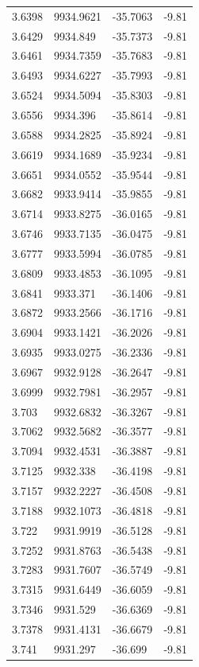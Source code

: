 \begin{table}[H]
\begin{tabular}{llll}
3.6398 & 9934.9621 & -35.7063 & -9.81 \\
3.6429 & 9934.849 & -35.7373 & -9.81 \\
3.6461 & 9934.7359 & -35.7683 & -9.81 \\
3.6493 & 9934.6227 & -35.7993 & -9.81 \\
3.6524 & 9934.5094 & -35.8303 & -9.81 \\
3.6556 & 9934.396 & -35.8614 & -9.81 \\
3.6588 & 9934.2825 & -35.8924 & -9.81 \\
3.6619 & 9934.1689 & -35.9234 & -9.81 \\
3.6651 & 9934.0552 & -35.9544 & -9.81 \\
3.6682 & 9933.9414 & -35.9855 & -9.81 \\
3.6714 & 9933.8275 & -36.0165 & -9.81 \\
3.6746 & 9933.7135 & -36.0475 & -9.81 \\
3.6777 & 9933.5994 & -36.0785 & -9.81 \\
3.6809 & 9933.4853 & -36.1095 & -9.81 \\
3.6841 & 9933.371 & -36.1406 & -9.81 \\
3.6872 & 9933.2566 & -36.1716 & -9.81 \\
3.6904 & 9933.1421 & -36.2026 & -9.81 \\
3.6935 & 9933.0275 & -36.2336 & -9.81 \\
3.6967 & 9932.9128 & -36.2647 & -9.81 \\
3.6999 & 9932.7981 & -36.2957 & -9.81 \\
3.703 & 9932.6832 & -36.3267 & -9.81 \\
3.7062 & 9932.5682 & -36.3577 & -9.81 \\
3.7094 & 9932.4531 & -36.3887 & -9.81 \\
3.7125 & 9932.338 & -36.4198 & -9.81 \\
3.7157 & 9932.2227 & -36.4508 & -9.81 \\
3.7188 & 9932.1073 & -36.4818 & -9.81 \\
3.722 & 9931.9919 & -36.5128 & -9.81 \\
3.7252 & 9931.8763 & -36.5438 & -9.81 \\
3.7283 & 9931.7607 & -36.5749 & -9.81 \\
3.7315 & 9931.6449 & -36.6059 & -9.81 \\
3.7346 & 9931.529 & -36.6369 & -9.81 \\
3.7378 & 9931.4131 & -36.6679 & -9.81 \\
3.741 & 9931.297 & -36.699 & -9.81 \\

\end{tabular}
\end{table}
